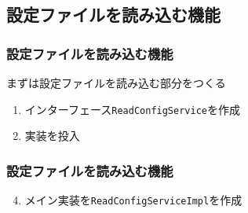\subsection{設定ファイルを読み込む機能}

\begin{frame}
  \frametitle{設定ファイルを読み込む機能}

  まずは設定ファイルを読み込む部分をつくる
  \begin{enumerate}
    \item<2-> インターフェース\lstinline|ReadConfigService|を作成
      
    \item<3-> 実装を投入
      
  \end{enumerate}
\end{frame}

\begin{frame}
  \frametitle{設定ファイルを読み込む機能}

  \begin{enumerate}
    \setcounter{enumi}{3}
    \item<1-> メイン実装を\lstinline|ReadConfigServiceImpl|を作成
      
  \end{enumerate}

  \begin{center}
  \end{center}
\end{frame}

